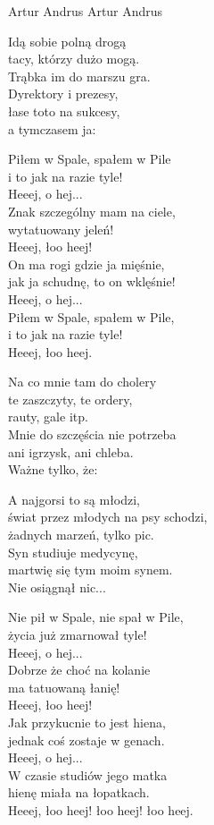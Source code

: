 {Artur Andrus}
{Artur Andrus}
\begin{text}
Idą sobie polną drogą\\
tacy, którzy dużo mogą.\\
Trąbka im do marszu gra.\\
Dyrektory i prezesy,\\
łase toto na sukcesy, \\
a tymczasem ja:

\vin Piłem w Spale, spałem w Pile\\
\vin i to jak na razie tyle!\\
\vin Heeej, o hej...\\
\vin Znak szczególny mam na ciele,\\
\vin wytatuowany jeleń!\\
\vin Heeej, łoo heej!\\
\vin On ma rogi gdzie ja mięśnie, \\
\vin jak ja schudnę, to on wklęśnie!\\
\vin Heeej, o hej...\\
\vin Piłem w Spale, spałem w Pile,\\
\vin i to jak na razie tyle!\\
\vin Heeej, łoo heej.

Na co mnie tam do cholery\\
te zaszczyty, te ordery,\\
rauty, gale itp.\\
Mnie do szczęścia nie potrzeba\\
ani igrzysk, ani chleba.\\
Ważne tylko, że:

A najgorsi to są młodzi,\\
świat przez młodych na psy schodzi,\\
żadnych marzeń, tylko pic.\\
Syn studiuje medycynę,\\
martwię się tym moim synem.\\
Nie osiągnął nic...

\vin Nie pił w Spale, nie spał w Pile,\\
\vin życia już zmarnował tyle!\\
\vin Heeej, o hej...\\
\vin Dobrze że choć na kolanie\\
\vin ma tatuowaną łanię!\\
\vin Heeej, łoo heej!\\
\vin Jak przykucnie to jest hiena,\\
\vin jednak coś zostaje w genach.\\
\vin Heeej, o hej... \\
\vin W czasie studiów jego matka\\
\vin hienę miała na łopatkach.\\
\vin Heeej, łoo heej! łoo heej! łoo heej.
\end{text}
\begin{chord}
\end{chord}